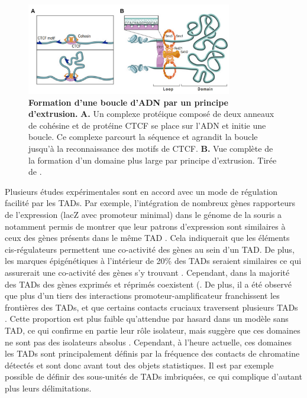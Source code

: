 \begin{figure}[H]
    \centering
    \includegraphics[width=0.8\textwidth, page=1] {figures/introduction/fig13.png}
    \caption[Formation d'une boucle d'\acrshort{ADN} par un principe d'extrusion.]{
    \textbf{Formation d'une boucle d'\acrshort{ADN} par un principe d'extrusion.}
    \textbf{A.} Un complexe protéique composé de deux anneaux de cohésine et de protéine CTCF se place sur l'ADN et initie une boucle. Ce complexe parcourt la séquence et agrandit la boucle jusqu'à la reconnaissance des motifs de CTCF. \textbf{B.} Vue complète de la formation d'un domaine plus large par principe d'extrusion. Tirée de \citep{sanborn_chromatin_2015}.\\
    }
    \label{fig:Fig13}
\end{figure}

Plusieurs études expérimentales sont en accord avec un mode de régulation facilité par les \acrshort{TAD}s. Par exemple, l’intégration de nombreux gènes rapporteurs de l’expression (lacZ avec promoteur minimal) dans le génome de la souris a notamment permis de montrer que leur patrons d’expression sont similaires à ceux des gènes présents dans le même \acrshort{TAD} \citep{symmons_functional_2014}. Cela indiquerait que les éléments \gls{cis}-régulateurs permettent une co-activité des gènes au sein d’un \acrshort{TAD}. De plus, les marques épigénétiques à l’intérieur de 20\% des \acrshort{TAD}s seraient similaires ce qui assurerait une co-activité des gènes s’y trouvant \citep{le_dily_distinct_2014}. Cependant, dans la majorité des \acrshort{TAD}s des gènes exprimés et réprimés coexistent (\citep{le_dily_distinct_2014}. De plus, il a été observé que plus d’un tiers des interactions promoteur-\gls{amplificateur} franchissent les frontières des \acrshort{TAD}s, et que certains contacts cruciaux traversent plusieurs \acrshort{TAD}s \citep{javierre_lineage-specific_2016}. Cette proportion est plus faible qu’attendue par hasard dans un modèle sans \acrshort{TAD}, ce qui confirme en partie leur rôle isolateur, mais suggère que ces domaines ne sont pas des isolateurs absolus \citep{schoenfelder_long-range_2019}. Cependant, à l’heure actuelle, ces domaines les \acrshort{TAD}s sont principalement définis par la fréquence des contacts de chromatine détectés et sont donc avant tout des objets statistiques. Il est par exemple possible de définir des sous-unités de \acrshort{TAD}s imbriquées, ce qui complique d’autant plus leurs délimitations.

